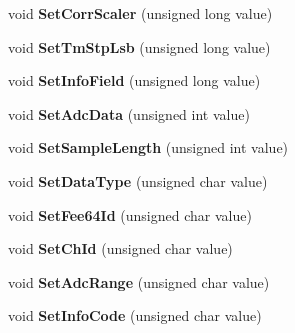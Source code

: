 \begin{DoxyCompactItemize}
\item 
\hypertarget{classUnpacker_ac86b7c6f573081f2d25933f59e99ad2a}{void {\bfseries Set\-Corr\-Scaler} (unsigned long value)}\label{classUnpacker_ac86b7c6f573081f2d25933f59e99ad2a}

\item 
\hypertarget{classUnpacker_a89bf86b9060b0c86179a09f16b1e42ac}{void {\bfseries Set\-Tm\-Stp\-Lsb} (unsigned long value)}\label{classUnpacker_a89bf86b9060b0c86179a09f16b1e42ac}

\item 
\hypertarget{classUnpacker_a14db23a0c6a42b90ceedf0d6eedcde56}{void {\bfseries Set\-Info\-Field} (unsigned long value)}\label{classUnpacker_a14db23a0c6a42b90ceedf0d6eedcde56}

\item 
\hypertarget{classUnpacker_a5654ec8872d662a8b8e08e028702904f}{void {\bfseries Set\-Adc\-Data} (unsigned int value)}\label{classUnpacker_a5654ec8872d662a8b8e08e028702904f}

\item 
\hypertarget{classUnpacker_a002ae77af3e8ef815227f84bd3c87dcc}{void {\bfseries Set\-Sample\-Length} (unsigned int value)}\label{classUnpacker_a002ae77af3e8ef815227f84bd3c87dcc}

\item 
\hypertarget{classUnpacker_a560ebee766ca8a64bedba7e63d6d0923}{void {\bfseries Set\-Data\-Type} (unsigned char value)}\label{classUnpacker_a560ebee766ca8a64bedba7e63d6d0923}

\item 
\hypertarget{classUnpacker_ac508e9c02bab43780627cc3c524cf170}{void {\bfseries Set\-Fee64\-Id} (unsigned char value)}\label{classUnpacker_ac508e9c02bab43780627cc3c524cf170}

\item 
\hypertarget{classUnpacker_a2b43b0eeb5e955119a74a46318255fae}{void {\bfseries Set\-Ch\-Id} (unsigned char value)}\label{classUnpacker_a2b43b0eeb5e955119a74a46318255fae}

\item 
\hypertarget{classUnpacker_abda952e6219fb87c334c06c50b0d3cd5}{void {\bfseries Set\-Adc\-Range} (unsigned char value)}\label{classUnpacker_abda952e6219fb87c334c06c50b0d3cd5}

\item 
\hypertarget{classUnpacker_a0117e3acc89039202fe59040fcd0dd0b}{void {\bfseries Set\-Info\-Code} (unsigned char value)}\label{classUnpacker_a0117e3acc89039202fe59040fcd0dd0b}


\end{DoxyCompactItemize}
